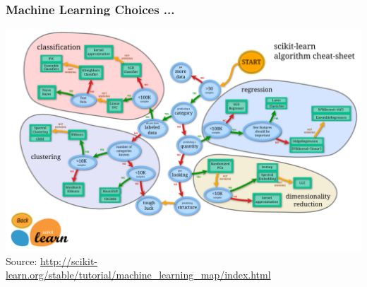 \documentclass{beamer}
\newcommand{\Real}{\mathbb{R}}
\newcommand{\I}{\mathbb{I}}
\renewcommand{\P}[1]{\mathbb{P}\left[#1\right]}
\begin{document}
\begin{frame} \frametitle{Machine Learning Choices ...}
\centering
\includegraphics[width=\linewidth]{../figs/class1/ml_map.png}\\
{\tiny Source: \url{http://scikit-learn.org/stable/tutorial/machine_learning_map/index.html}} \\[3mm]
\end{frame}

\end{document}

